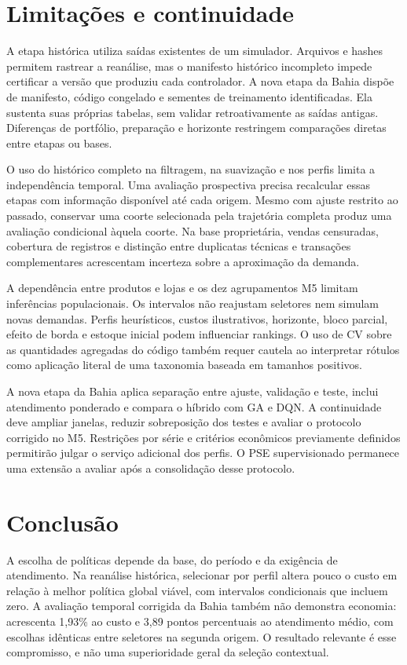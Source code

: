 \documentclass[preprint,12pt]{elsarticle}
\begin{document}
\section{Limitações e continuidade}
A etapa histórica utiliza saídas existentes de um simulador. Arquivos e hashes permitem rastrear a reanálise, mas o manifesto histórico incompleto impede certificar a versão que produziu cada controlador. A nova etapa da Bahia dispõe de manifesto, código congelado e sementes de treinamento identificadas. Ela sustenta suas próprias tabelas, sem validar retroativamente as saídas antigas. Diferenças de portfólio, preparação e horizonte restringem comparações diretas entre etapas ou bases.

O uso do histórico completo na filtragem, na suavização e nos perfis limita a independência temporal. Uma avaliação prospectiva precisa recalcular essas etapas com informação disponível até cada origem. Mesmo com ajuste restrito ao passado, conservar uma coorte selecionada pela trajetória completa produz uma avaliação condicional àquela coorte. Na base proprietária, vendas censuradas, cobertura de registros e distinção entre duplicatas técnicas e transações complementares acrescentam incerteza sobre a aproximação da demanda.

A dependência entre produtos e lojas e os dez agrupamentos M5 limitam inferências populacionais. Os intervalos não reajustam seletores nem simulam novas demandas. Perfis heurísticos, custos ilustrativos, horizonte, bloco parcial, efeito de borda e estoque inicial podem influenciar rankings. O uso de CV sobre as quantidades agregadas do código também requer cautela ao interpretar rótulos como aplicação literal de uma taxonomia baseada em tamanhos positivos.

A nova etapa da Bahia aplica separação entre ajuste, validação e teste, inclui atendimento ponderado e compara o híbrido com GA e DQN. A continuidade deve ampliar janelas, reduzir sobreposição dos testes e avaliar o protocolo corrigido no M5. Restrições por série e critérios econômicos previamente definidos permitirão julgar o serviço adicional dos perfis. O PSE supervisionado permanece uma extensão a avaliar após a consolidação desse protocolo.

\section{Conclusão}
A escolha de políticas depende da base, do período e da exigência de atendimento. Na reanálise histórica, selecionar por perfil altera pouco o custo em relação à melhor política global viável, com intervalos condicionais que incluem zero. A avaliação temporal corrigida da Bahia também não demonstra economia: acrescenta 1,93\% ao custo e 3,89 pontos percentuais ao atendimento médio, com escolhas idênticas entre seletores na segunda origem. O resultado relevante é esse compromisso, e não uma superioridade geral da seleção contextual.
\end{document}
